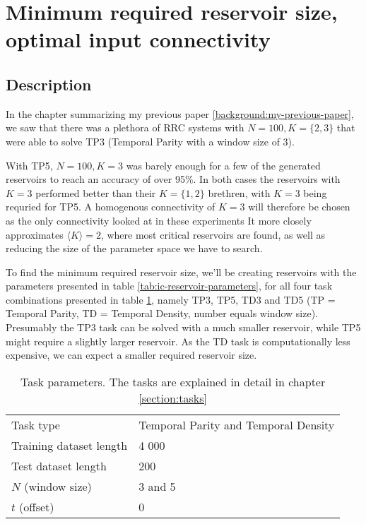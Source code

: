 \section{Minimum required reservoir size, optimal input connectivity}
\label{section:required_reservoir_size}

\subsection{Description}

In the chapter summarizing my previous paper \ref{background:my-previous-paper},
we saw that there was a plethora of RRC systems with $N=100, K=\{2, 3\}$ that were able to solve TP3 (Temporal Parity with a window size of 3).

With TP5, $N=100, K=3$ was barely enough for a few of the generated reservoirs to reach an accuracy of over 95\%.
In both cases the reservoirs with $K=3$ performed better than their $K=\{1, 2\}$ brethren,
with $K=3$ being requried for TP5.
A homogenous connectivity of $K=3$ will therefore be chosen as the only connectivity looked at in these experiments
It more closely approximates $\langle K \rangle = 2 $, where most critical reservoirs are found,
as well as reducing the size of the parameter space we have to search.

To find the minimum required reservoir size,
we'll be creating reservoirs with the parameters presented in table \ref{tab:ic-reservoir-parameters},
for all four task combinations presented in table \ref{tab:tasks},
namely TP3, TP5, TD3 and TD5 (TP = Temporal Parity, TD = Temporal Density, number equals window size).
Presumably the TP3 task can be solved with a much smaller reservoir,
while TP5 might require a slightly larger reservoir.
As the TD task is computationally less expensive,
we can expect a smaller required reservoir size.

\begin{table}[ht]
    \centering
    \caption{Task parameters. The tasks are explained in detail in chapter \ref{section:tasks}}
    \label{tab:tasks}
    \begin{tabular}{ll}
        Task type               & Temporal Parity and Temporal Density \\
        Training dataset length & 4 000                       \\
        Test dataset length     & 200                         \\
        $N$ (window size)       & 3 and 5                     \\
        $t$ (offset)            & 0
    \end{tabular}
\end{table}

